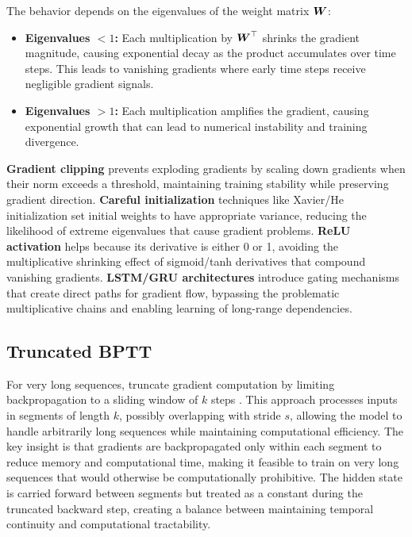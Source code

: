 The behavior depends on the eigenvalues of the weight matrix $\boldsymbol{W}$:
\begin{itemize}
    \item \textbf{Eigenvalues $< 1$:} Each multiplication by $\boldsymbol{W}^\top$ shrinks the gradient magnitude, causing exponential decay as the product accumulates over time steps. This leads to vanishing gradients where early time steps receive negligible gradient signals.
    \item \textbf{Eigenvalues $> 1$:} Each multiplication amplifies the gradient, causing exponential growth that can lead to numerical instability and training divergence.
\end{itemize}


\textbf{Gradient clipping} prevents exploding gradients by scaling down gradients when their norm exceeds a threshold, maintaining training stability while preserving gradient direction. \textbf{Careful initialization} techniques like Xavier/He initialization set initial weights to have appropriate variance, reducing the likelihood of extreme eigenvalues that cause gradient problems. \textbf{ReLU activation} helps because its derivative is either 0 or 1, avoiding the multiplicative shrinking effect of sigmoid/tanh derivatives that compound vanishing gradients. \textbf{LSTM/GRU architectures} introduce gating mechanisms that create direct paths for gradient flow, bypassing the problematic multiplicative chains and enabling learning of long-range dependencies.

\subsection{Truncated BPTT}

For very long sequences, truncate gradient computation by limiting backpropagation to a sliding window of $k$ steps \cite{GoodfellowEtAl2016}. This approach processes inputs in segments of length $k$, possibly overlapping with stride $s$, allowing the model to handle arbitrarily long sequences while maintaining computational efficiency. The key insight is that gradients are backpropagated only within each segment to reduce memory and computational time, making it feasible to train on very long sequences that would otherwise be computationally prohibitive. The hidden state is carried forward between segments but treated as a constant during the truncated backward step, creating a balance between maintaining temporal continuity and computational tractability.

